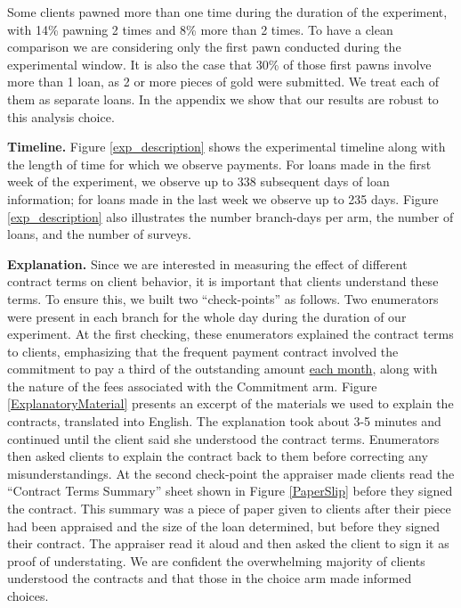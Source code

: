 \documentclass[11pt, a4paper]{article}
\begin{document}
Some clients pawned more than one time during the duration of the experiment, with 14\% pawning 2 times and 8\% more than 2 times. To have a clean comparison we are considering only the first pawn conducted during the experimental window. It is also the case that 30\% of those first pawns involve more than 1 loan, as 2 or more pieces of gold were submitted. We treat each of them as separate loans. In the appendix we show that our results are robust to this analysis choice. 

\vspace{.2in}
\noindent \textbf{Timeline.} Figure \ref{exp_description} shows the experimental timeline along with the length of time for which we observe payments. For loans made in the first week of the experiment, we observe up to 338 subsequent days of loan information; for loans made in the last week we observe up to 235 days. Figure \ref{exp_description} also illustrates the number branch-days per arm, the number of loans, and the number of surveys. %

\vspace{.2in}
\noindent \textbf{Explanation.} Since we are interested in measuring the effect of different contract terms on client behavior, it is important that clients understand these terms. To ensure this, we built two ``check-points'' as follows.  Two enumerators were present in each branch for the whole day during the duration of our experiment. At the first checking, these enumerators explained the contract terms to clients, emphasizing that the frequent payment contract involved the commitment to pay a third of the outstanding amount \underline{each month}, along with the nature of the fees associated with the Commitment arm. Figure \ref{ExplanatoryMaterial} presents an excerpt of the materials we used to explain the contracts, translated into English. The explanation took about 3-5 minutes and continued until the client said she understood the contract terms. Enumerators then asked clients to explain the contract back to them before correcting any misunderstandings. At the second check-point the appraiser made clients read the ``Contract Terms Summary'' sheet shown in Figure \ref{PaperSlip} before they signed the contract. This summary was a piece of paper given to clients after their piece had been appraised and the size of the loan determined, but before they signed their contract. The appraiser read it aloud and then asked the client to sign it as proof of understating. %
We are confident the overwhelming majority of clients understood the contracts and that those in the choice arm made informed choices.
\end{document}
